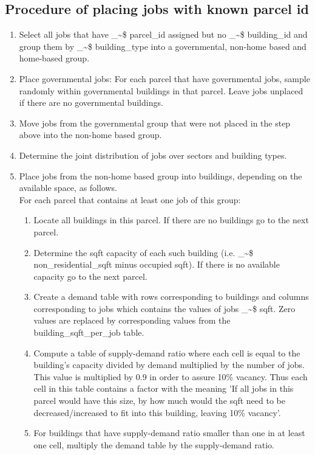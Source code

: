 \documentclass[11pt]{article}
\makeatletter
\newcommand\code{\bgroup\@makeother\_\@makeother\~\@makeother\$\@codex}
\def\@codex#1{{\normalfont\ttfamily\hyphenchar\font=-1 #1}\egroup}
\makeatother
\begin{document}
\subsection{Procedure of placing jobs with known parcel id}
\begin{enumerate}
\item Select all jobs that have \code{parcel_id} assigned but no \code{building_id} and group them by \code{building_type} into a governmental, non-home based and home-based group.
\item Place governmental jobs: For each parcel that have governmental jobs, sample randomly within governmental buildings in that parcel. Leave jobs unplaced if there are no governmental buildings. 
\item Move jobs from the governmental group that were not placed in the step above  into the non-home based group.
\item Determine the joint distribution of jobs over sectors and building types.
\item Place jobs from the non-home based group into buildings, depending on the available space, as follows.\\ For each parcel that contains at least one job of this group:
	\begin{enumerate}
	\item Locate all buildings in this parcel. If there are no buildings go to the next parcel.
	\item Determine the sqft capacity of each such building (i.e. \code{non_residential_sqft} minus occupied sqft). If there is no available capacity go to the next parcel.
	\item Create a demand table with rows corresponding to buildings and columns corresponding to jobs which contains the values of jobs \code{sqft}. Zero values are replaced by corresponding values from the   building\_sqft\_per\_job table.
	\item Compute a table of supply-demand ratio where each cell is equal to the building's capacity divided by demand multiplied by the number of jobs. This value is multiplied by 0.9 in order to assure 10\% vacancy. Thus each cell in this table contains a factor with the meaning 'If all jobs in this parcel would have this size, by how much would the sqft need to be decreased/increased to fit into this building, leaving 10\% vacancy'.
	\item For buildings that have supply-demand ratio smaller than one in at least one cell, multiply the demand table by the supply-demand ratio.

\end{enumerate}
\end{enumerate}
\end{document}
